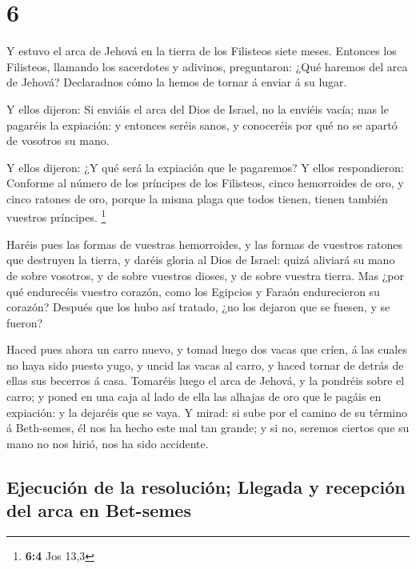 \hypertarget{section-5}{%
\section{6}\label{section-5}}

 Y estuvo el arca de Jehová en la tierra de los Filisteos
siete meses.  Entonces los Filisteos, llamando los
sacerdotes y adivinos, preguntaron: ¿Qué haremos del arca de Jehová?
Declaradnos cómo la hemos de tornar á enviar á su lugar.

 Y ellos dijeron: Si enviáis el arca del Dios de Israel, no
la enviéis vacía; mas le pagaréis la expiación: y entonces seréis sanos,
y conoceréis por qué no se apartó de vosotros su mano.

 Y ellos dijeron: ¿Y qué será la expiación que le pagaremos?
Y ellos respondieron: Conforme al número de los príncipes de los
Filisteos, cinco hemorroides de oro, y cinco ratones de oro, porque la
misma plaga que todos tienen, tienen también vuestros príncipes.
\footnote{\textbf{6:4} Jos 13,3}

 Haréis pues las formas de vuestras hemorroides, y las
formas de vuestros ratones que destruyen la tierra, y daréis gloria al
Dios de Israel: quizá aliviará su mano de sobre vosotros, y de sobre
vuestros dioses, y de sobre vuestra tierra.  Mas ¿por qué
endurecéis vuestro corazón, como los Egipcios y Faraón endurecieron su
corazón? Después que los hubo así tratado, ¿no los dejaron que se
fuesen, y se fueron?

 Haced pues ahora un carro nuevo, y tomad luego dos vacas
que críen, á las cuales no haya sido puesto yugo, y uncid las vacas al
carro, y haced tornar de detrás de ellas sus becerros á casa.
 Tomaréis luego el arca de Jehová, y la pondréis sobre el
carro; y poned en una caja al lado de ella las alhajas de oro que le
pagáis en expiación: y la dejaréis que se vaya.  Y mirad: si
sube por el camino de su término á Beth-semes, él nos ha hecho este mal
tan grande; y si no, seremos ciertos que su mano no nos hirió, nos ha
sido accidente.

\hypertarget{ejecuciuxf3n-de-la-resoluciuxf3n-llegada-y-recepciuxf3n-del-arca-en-bet-semes}{%
\subsection{Ejecución de la resolución; Llegada y recepción del arca en
Bet-semes}\label{ejecuciuxf3n-de-la-resoluciuxf3n-llegada-y-recepciuxf3n-del-arca-en-bet-semes}}

